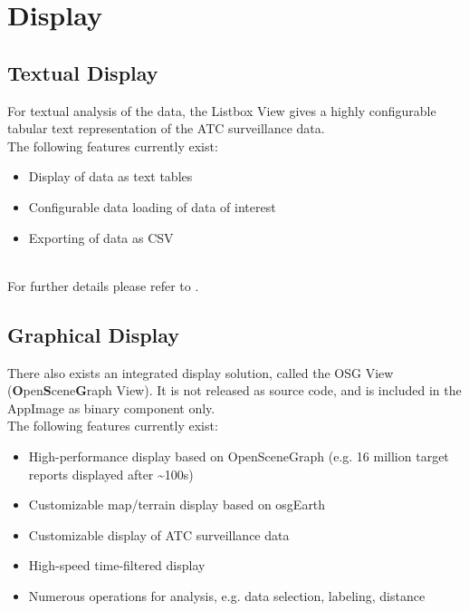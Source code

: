 \section{Display}

\subsection{Textual Display}

For textual analysis of the data, the Listbox View gives a highly configurable tabular text representation of the ATC surveillance data. \\

The following features currently exist:

\begin{itemize}  
\item Display of data as text tables
\item Configurable data loading of data of interest
\item Exporting of data as CSV
\end{itemize} 
\ \\

For further details please refer to .

\subsection{Graphical Display}
There also exists an integrated display solution, called the OSG View (\textbf{O}pen\textbf{S}cene\textbf{G}raph View). It is not released as source code, and is included in the AppImage as binary component only. \\

The following features currently exist:

\begin{itemize}  
\item High-performance display based on OpenSceneGraph (e.g. 16 million target reports displayed after \textasciitilde100s)
\item Customizable map/terrain display based on osgEarth
\item Customizable display of ATC surveillance data
\item High-speed time-filtered display
\item Numerous operations for analysis, e.g. data selection, labeling, distance measurement
\item Relatively low memory footprint (e.g. 16 million target reports in \textasciitilde6 GB RAM)
\end{itemize} 
\ \\

